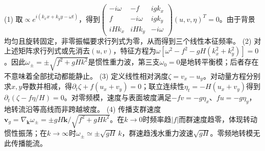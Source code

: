 (1) 取\(\propto e^{i(k_xx+k_yy-\omega t)}\)，得到\(\begin{pmatrix}-i\omega&-f&igk_x\\f&-i\omega&igk_y\\iHk_x&iHk_y&-i\omega\end{pmatrix}(u,v,\eta)^T=0\)。由于背景均匀且旋转固定，非零振幅要求行列式为零，从而得到三个线性本征频率。
(2) 对上述矩阵求行列式或先消去\((u,v)\)，特征方程为\(\omega[\omega^2-f^2-gH(k_x^2+k_y^2)]=0\)。因此\(\omega_\pm=\pm\sqrt{f^2+gHk^2}\)是惯性重力波，第三支\(\omega_0=0\)是地转平衡模；后者存在不意味着全部扰动都能静止。
(3) 定义线性相对涡度\(\zeta=v_x-u_y\)。对动量方程分别求\(x,y\)导数并相减，得\(\partial_t\zeta+f(u_x+v_y)=0\)；联立连续性\(\eta_t=-H(u_x+v_y)\)得到\(\partial_t(\zeta-f\eta/H)=0\)。对零频模，速度与表面坡度满足\(-fv=-g\eta_x\)、\(fu=-g\eta_y\)，地转流沿等高线而非跨越坡度。
(4) 传播支群速度\(\boldsymbol v_g=\nabla_{\boldsymbol k}\omega_\pm=\pm gH\boldsymbol k/\sqrt{f^2+gHk^2}\)。在\(k\to0\)时频率趋\(|f|\)而群速度趋零，体现转动惯性振荡；在\(k\to\infty\)时\(\omega_\pm\simeq\pm\sqrt{gH}\,k\)，群速趋浅水重力波速\(\sqrt{gH}\)。零频地转模无此传播能流。
